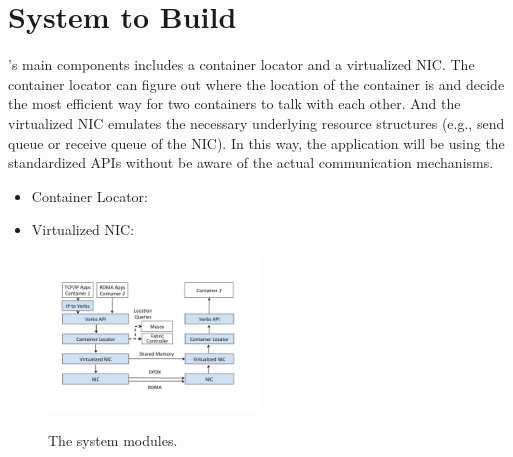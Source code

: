 \section{System to Build} \label{sec:promise}

\Name's main components includes a container locator and a virtualized NIC.
The container locator can figure out where the location of the container is and
decide the most efficient way for two containers to talk with each other.
And the virtualized NIC emulates the necessary underlying resource structures 
(e.g., send queue or receive queue of the NIC). In this way, the application will
be using the standardized APIs without be aware of the actual communication
mechanisms.

\begin{itemize}
  \item Container Locator:
  \item Virtualized NIC:
\end{itemize}

     \begin{figure}[ht]
     \centering 
     \includegraphics[width=0.5\textwidth]{figures/system/system_modules.pdf}      
     \label{fig:system_modules}
     \caption{The system modules.} 
     \end{figure}